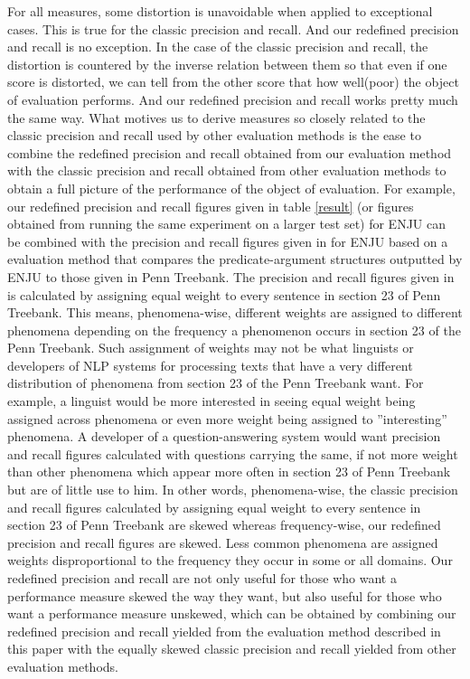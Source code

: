 \documentclass[11pt]{article}
\begin{document}
For all measures, some distortion is unavoidable when applied to exceptional cases. This is true for the classic precision and recall. And our redefined precision and recall is no exception. In the case of the classic precision and recall, the distortion is countered by the inverse relation between them so that even if one score is distorted, we can tell from the other score that how well(poor) the object of evaluation performs. And our redefined precision and recall works pretty much the same way. What motives us to derive measures so closely related to the classic precision and recall used by other evaluation methods is the ease to combine the redefined precision and recall obtained from our evaluation method with the classic precision and recall obtained from other evaluation methods to obtain a full picture of the performance of the object of evaluation. For example, our redefined precision and recall figures given in table \ref{result} (or figures obtained from running the same experiment on a larger test set)  for ENJU can be combined with the precision and recall figures given in \cite{miyao2006} for ENJU based on a evaluation method that compares the predicate-argument structures outputted by ENJU to those given in Penn Treebank. The precision and recall figures given in \cite{miyao2006} is calculated by assigning equal weight to every sentence in section 23 of Penn Treebank. This means, phenomena-wise, different weights are assigned to different phenomena depending on the frequency a phenomenon occurs in section 23 of the Penn Treebank. Such assignment of weights may not be what linguists or developers of NLP systems for processing texts that have a very different distribution of phenomena from section 23 of the Penn Treebank want. For example, a linguist would be more interested in seeing equal weight being assigned across phenomena or even more weight being assigned to ''interesting'' phenomena. A developer of a question-answering system  would want precision and recall figures calculated with questions carrying the same, if not more weight than other phenomena which appear more often in section 23 of Penn Treebank but are of little use to him. In other words, phenomena-wise, the classic precision and recall figures calculated by assigning equal weight to every sentence in section 23 of Penn Treebank are skewed whereas frequency-wise, our redefined precision and recall figures are skewed. Less common phenomena are assigned weights disproportional to the frequency they occur in some or all domains. Our redefined precision and recall are not only useful for those who want a performance measure skewed the way they want, but also useful for those who want a performance measure unskewed, which can be obtained by combining our redefined precision and recall yielded from the evaluation method described in this paper with the equally skewed classic precision and recall yielded from other evaluation methods.
\end{document}
